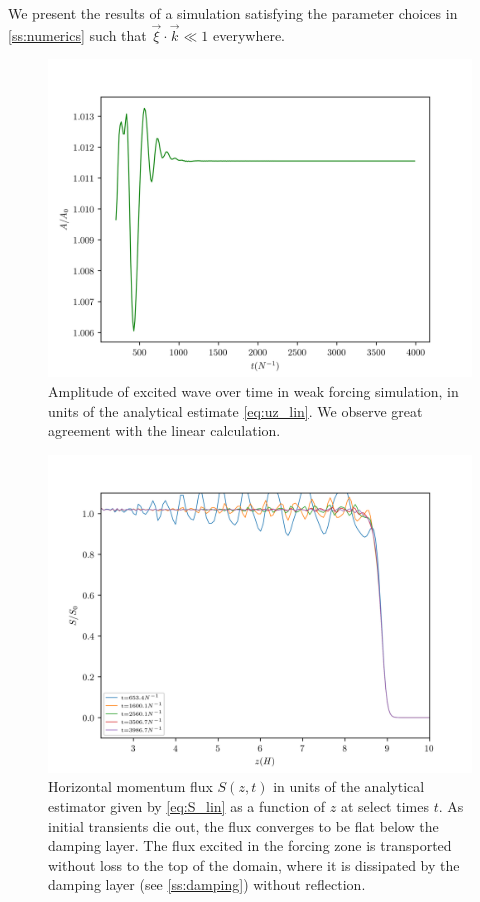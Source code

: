 \documentclass[
        fleqn,
        usenatbib,
    ]{mnras}
\begin{document}
We present the results of a simulation satisfying the parameter choices in
\autoref{ss:numerics} such that $\vec{\xi} \cdot \vec{k} \ll 1$ everywhere.
\begin{figure}[t]
    \centering
    \includegraphics[width=\columnwidth]{plots/lin_amps.png}
    \caption{Amplitude of excited wave over time in weak forcing simulation,
    in units of the analytical estimate \autoref{eq:uz_lin}. We observe great
    agreement with the linear calculation.}\label{fig:lin_amps}
\end{figure}
\begin{figure}[t]
    \centering
    \includegraphics[width=\columnwidth]{plots/lin_fluxes.png}
    \caption{Horizontal momentum flux $S(z, t)$ in units of the analytical estimator
    given by \autoref{eq:S_lin} as a function of $z$ at select times $t$. As
    initial transients die out, the flux converges to be flat below the damping
    layer. The flux excited in the forcing zone is transported without loss to
    the top of the domain, where it is dissipated by the damping layer
    (see \autoref{ss:damping}) without reflection.}\label{fig:lin_fluxes}
\end{figure}
\end{document}
